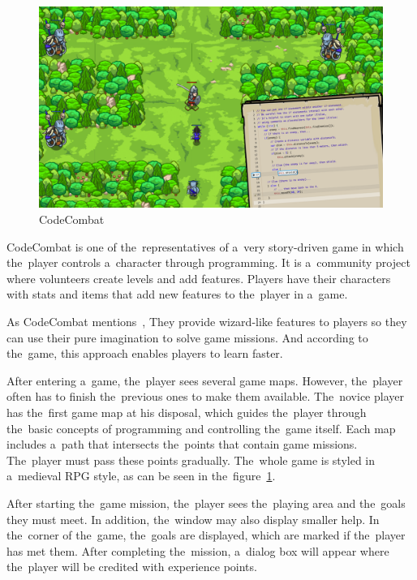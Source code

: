 \begin{figure}
    \centering
    \includegraphics[width=1\linewidth]{assets/similar-games/codecombat.png}
    \caption{CodeCombat~\cite{a2022_codecombat}}
    \label{fig:codecombat}
\end{figure}

CodeCombat is one of the~representatives of a~very story-driven game in which the~player controls a~character through programming.
It is a~community project where volunteers create levels and add features.
Players have their characters with stats and items that add new features to the~player in a~game.

As CodeCombat mentions~\cite{a2022_codecombat}, 
They provide wizard-like features to players so they can use their pure imagination to solve game missions.
And according to the~game, this approach enables players to learn faster.

After entering a~game, the~player sees several game maps.
However, the~player often has to finish the~previous ones to make them available.
The~novice player has the~first game map at his disposal, which guides the~player through the~basic concepts of programming and controlling the~game itself.
Each map includes a~path that intersects the~points that contain game missions.
The~player must pass these points gradually.
The~whole game is styled in a~medieval RPG style, as can be seen in the~figure~\ref{fig:codecombat}.

After starting the~game mission, the~player sees the~playing area and the~goals they must meet.
In addition, the~window may also display smaller help.
In the~corner of the~game, the~goals are displayed, which are marked if the~player has met them.
After completing the~mission, a~dialog box will appear where the~player will be credited with experience points.

